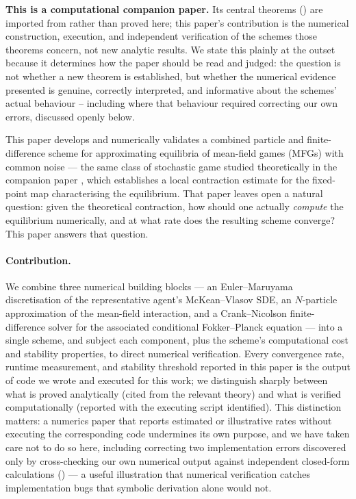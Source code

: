 \documentclass[11pt]{article}
\theoremstyle{remark}
\begin{document}
\textbf{This is a computational companion paper.} Its central theorems
() are imported from
\citet{monyimba2026thesis,monyimba2026paper1} rather than proved here; this
paper's contribution is the numerical construction, execution, and independent
verification of the schemes those theorems concern, not new analytic results. We
state this plainly at the outset because it determines how the paper should be
read and judged: the question is not whether a new theorem is established, but
whether the numerical evidence presented is genuine, correctly interpreted, and
informative about the schemes' actual behaviour -- including where that behaviour
required correcting our own errors, discussed openly below.

This paper develops and numerically validates a combined particle and
finite-difference scheme for approximating equilibria of mean-field games (MFGs) with common noise
--- the same class of stochastic game studied theoretically in the companion paper
\citet{monyimba2026paper1}, which establishes a local contraction estimate for the
fixed-point map characterising the equilibrium. That paper leaves open a natural
question: given the theoretical contraction, how should one actually \emph{compute}
the equilibrium numerically, and at what rate does the resulting scheme converge?
This paper answers that question.

\paragraph{Contribution.} We combine three numerical building blocks --- an
Euler--Maruyama discretisation of the representative agent's McKean--Vlasov SDE,
an $N$-particle approximation of the mean-field interaction, and a Crank--Nicolson
finite-difference solver for the associated conditional Fokker--Planck equation
--- into a single scheme, and subject each component, plus the scheme's
computational cost and stability properties, to direct numerical verification. Every
convergence rate, runtime measurement, and stability threshold reported in this
paper is the output of code we wrote and executed for this work; we distinguish
sharply between what is proved analytically (cited from the relevant theory) and
what is verified computationally (reported with the executing script identified).
This distinction matters: a numerics paper that reports estimated or illustrative
rates without executing the corresponding code undermines its own purpose, and we
have taken care not to do so here, including correcting two implementation errors
discovered only by cross-checking our own numerical output against independent
closed-form calculations () --- a useful illustration
that numerical verification catches implementation bugs that symbolic derivation
alone would not.
\end{document}
